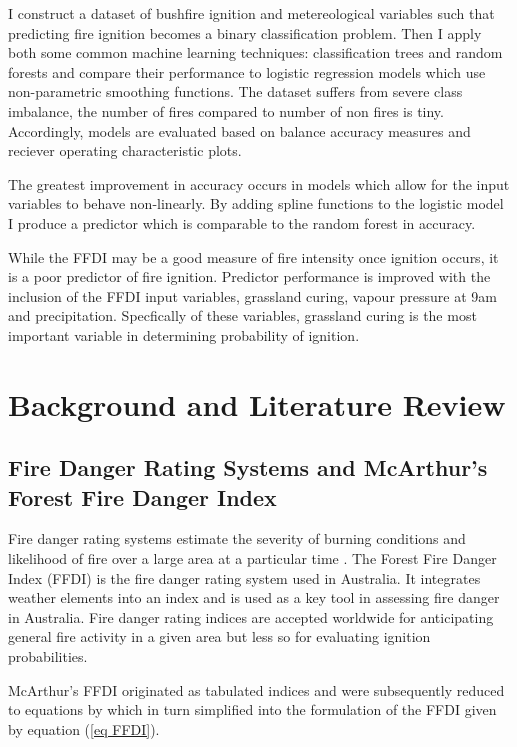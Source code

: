 \documentclass{article}
\begin{document}
I construct a dataset of bushfire ignition and metereological variables such that predicting fire ignition becomes a binary classification problem. Then I apply both some common machine learning techniques: classification trees and random forests and compare their performance to logistic regression models which use non-parametric smoothing functions. The dataset suffers from severe class imbalance, the number of fires compared to number of non fires is tiny. Accordingly, models are evaluated based on balance accuracy measures and reciever operating characteristic plots. 

 The greatest improvement in accuracy occurs in models which allow for the input variables to behave non-linearly. By adding spline functions to the logistic model I produce a predictor which is comparable to the random forest in accuracy. 

While the FFDI may be a good measure of fire intensity once ignition occurs, it is a poor predictor of fire ignition. Predictor performance is improved with the inclusion of the FFDI input variables, grassland curing, vapour pressure at 9am and precipitation. Specfically of these variables, grassland curing is the most important variable in determining probability of ignition. 


\section{Background and Literature Review}

\subsection{Fire Danger Rating Systems and McArthur's Forest Fire Danger Index}
Fire danger rating systems estimate the severity of burning conditions and likelihood of fire over a large area at a particular time \citep{chandler83, andrews03}. The Forest Fire Danger Index (FFDI) \citep{mcarthur67} is the fire danger rating system used in Australia. It integrates weather elements into an index and is used as a key tool in assessing fire danger in Australia. Fire danger rating indices are accepted worldwide for anticipating general fire activity in a given area but less so for evaluating ignition probabilities. 

McArthur’s FFDI originated as tabulated indices and were subsequently reduced to equations by \citet{noble80} which in turn simplified into the formulation of the FFDI given by equation (\ref{eq FFDI}). 
\end{document}
